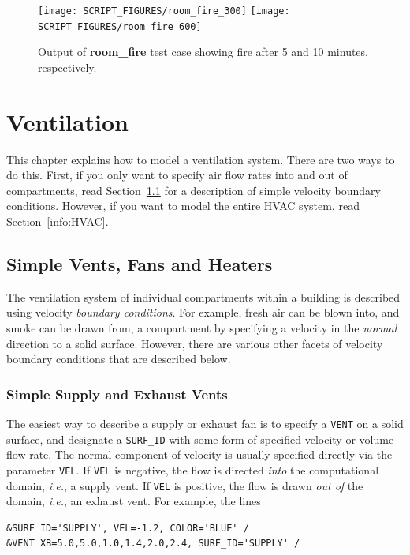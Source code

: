 \documentclass[11pt]{book}
\newcommand{\ct}{\tt\small}
\begin{document}
\begin{figure}[p]
\texttt{[image: SCRIPT\_FIGURES/room\_fire\_300]}
\texttt{[image: SCRIPT\_FIGURES/room\_fire\_600]}
\caption[Output of {\bf room\_fire} test case.]{Output of {\bf room\_fire} test case showing fire after
5 and 10 minutes, respectively.}
\label{room_fire}
\end{figure}

\newpage




\chapter{Ventilation}

This chapter explains how to model a ventilation system. There are two ways to do this. First, if you only want to specify air flow rates into and out of
compartments, read Section~\ref{info:Velocity_BC} for a description of simple velocity boundary conditions. However, if you want to
model the entire HVAC system, read Section~\ref{info:HVAC}.


\section{Simple Vents, Fans and Heaters}
\label{info:Velocity_BC}

The ventilation system of individual compartments within a building is described using
velocity {\em boundary conditions}. For example, fresh air can be blown into, and smoke can
be drawn from, a compartment by specifying a velocity in the {\em normal} direction to a solid
surface. However, there are various other facets of velocity boundary conditions that are described below.

\subsection{Simple Supply and Exhaust Vents}

The easiest way to describe a supply or exhaust fan is to specify a {\ct VENT} on a solid surface, and designate
a {\ct SURF\_ID} with some form of specified velocity or volume flow rate.
The normal component of velocity is usually specified directly via the parameter
{\ct VEL}. If {\ct VEL} is negative, the flow is directed {\em into} the
computational domain, {\em i.e.}, a supply vent. If {\ct VEL} is positive, the flow is drawn {\em out of} the
domain, {\em i.e.}, an exhaust vent. For example, the lines

\footnotesize
\begin{verbatim}
&SURF ID='SUPPLY', VEL=-1.2, COLOR='BLUE' /
&VENT XB=5.0,5.0,1.0,1.4,2.0,2.4, SURF_ID='SUPPLY' /
\end{verbatim}
\normalsize
\end{document}
